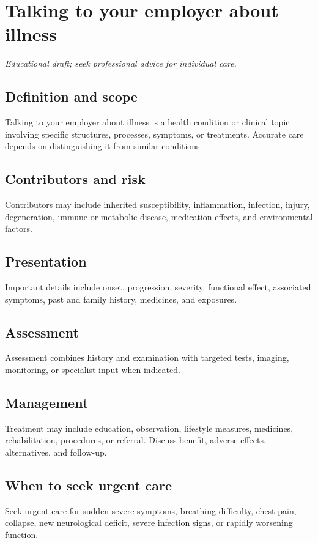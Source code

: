 \chapter{Talking to your employer about illness}
\medskip
\noindent\textit{Educational draft; seek professional advice for individual care.}

\section*{Definition and scope}
Talking to your employer about illness is a health condition or clinical topic involving specific structures, processes, symptoms, or treatments. Accurate care depends on distinguishing it from similar conditions.

\section*{Contributors and risk}
Contributors may include inherited susceptibility, inflammation, infection, injury, degeneration, immune or metabolic disease, medication effects, and environmental factors.

\section*{Presentation}
Important details include onset, progression, severity, functional effect, associated symptoms, past and family history, medicines, and exposures.

\section*{Assessment}
Assessment combines history and examination with targeted tests, imaging, monitoring, or specialist input when indicated.

\section*{Management}
Treatment may include education, observation, lifestyle measures, medicines, rehabilitation, procedures, or referral. Discuss benefit, adverse effects, alternatives, and follow-up.

\section*{When to seek urgent care}
Seek urgent care for sudden severe symptoms, breathing difficulty, chest pain, collapse, new neurological deficit, severe infection signs, or rapidly worsening function.


